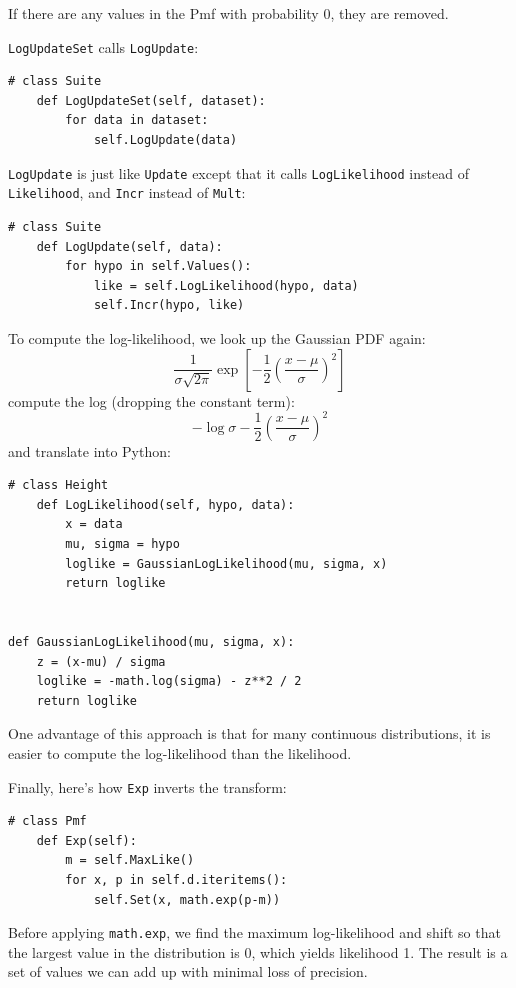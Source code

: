 \documentclass[12pt]{book}
\begin{document}
If there are any values in
the Pmf with probability 0, they are removed.

{\tt LogUpdateSet} calls {\tt LogUpdate}:

\begin{verbatim}
# class Suite
    def LogUpdateSet(self, dataset):
        for data in dataset:
            self.LogUpdate(data)
\end{verbatim}

{\tt LogUpdate} is just like {\tt Update} except that it calls
{\tt LogLikelihood} instead of {\tt Likelihood}, and {\tt Incr}
instead of {\tt Mult}:

\begin{verbatim}
# class Suite
    def LogUpdate(self, data):
        for hypo in self.Values():
            like = self.LogLikelihood(hypo, data)
            self.Incr(hypo, like)
\end{verbatim}

To compute the log-likelihood, we look up the Gaussian PDF again:
%
\[ \frac{1}{\sigma \sqrt{2 \pi}} \exp \left[ -\frac{1}{2} \left( \frac{x-\mu}{\sigma} \right)^2 \right] \]
%
compute the log (dropping the constant term):
%
\[ -\log \sigma -\frac{1}{2} \left( \frac{x-\mu}{\sigma} \right)^2 \]
%
and translate into Python:

\begin{verbatim}
# class Height
    def LogLikelihood(self, hypo, data):
        x = data
        mu, sigma = hypo
        loglike = GaussianLogLikelihood(mu, sigma, x)
        return loglike


def GaussianLogLikelihood(mu, sigma, x):
    z = (x-mu) / sigma
    loglike = -math.log(sigma) - z**2 / 2
    return loglike
\end{verbatim}

One advantage of this approach is that for many
continuous distributions, it is easier to
compute the log-likelihood than the likelihood.

Finally, here's how {\tt Exp} inverts the transform:

\begin{verbatim}
# class Pmf
    def Exp(self):
        m = self.MaxLike()
        for x, p in self.d.iteritems():
            self.Set(x, math.exp(p-m))
\end{verbatim}

Before applying {\tt math.exp}, we find the maximum log-likelihood
and shift so that the largest value in the distribution is 0, which
yields likelihood 1.  The result is a set of values we can add
up with minimal loss of precision.
\end{document}

